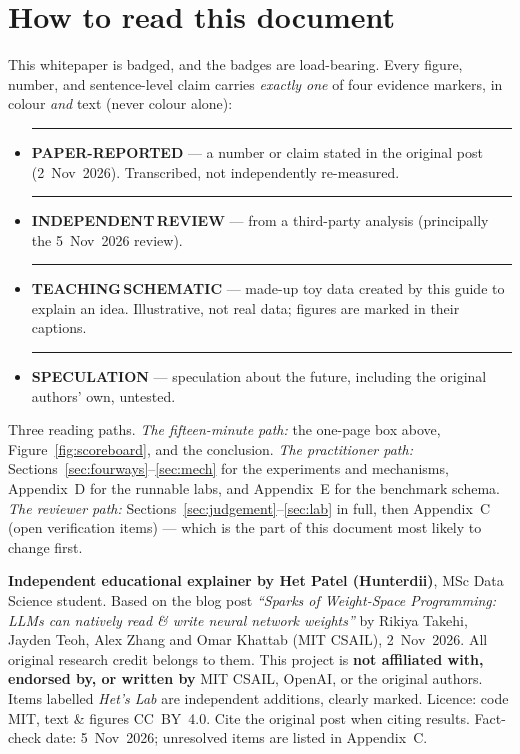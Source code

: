 \documentclass[11pt,a4paper]{article}
\newcommand{\bP}{\textcolor{wspblue}{\rule[0.12ex]{1.5mm}{1.5mm}}\;\textcolor{wspblue}{\textbf{PAPER-REPORTED}}}
\newcommand{\bR}{\textcolor{wspgreen}{\rule[0.12ex]{1.5mm}{1.5mm}}\;\textcolor{wspgreen}{\textbf{INDEPENDENT\,REVIEW}}}
\newcommand{\bS}{\textcolor{wspamber}{\rule[0.12ex]{1.5mm}{1.5mm}}\;\textcolor{wspamber}{\textbf{TEACHING\,SCHEMATIC}}}
\newcommand{\bX}{\textcolor{wspred}{\rule[0.12ex]{1.5mm}{1.5mm}}\;\textcolor{wspred}{\textbf{SPECULATION}}}
\begin{document}
\section*{How to read this document}

This whitepaper is badged, and the badges are load-bearing. Every figure, number, and sentence-level claim carries \emph{exactly one} of four evidence markers, in colour \emph{and} text (never colour alone):

\begin{itemize}[leftmargin=1.8em, itemsep=2pt]
\item \bP\; --- a number or claim stated in the original post (2~Nov~2026). Transcribed, not independently re-measured.
\item \bR\; --- from a third-party analysis (principally the 5~Nov~2026 review).
\item \bS\; --- made-up toy data created by this guide to explain an idea. Illustrative, not real data; figures are marked in their captions.
\item \bX\; --- speculation about the future, including the original authors' own, untested.
\end{itemize}

Three reading paths. \emph{The fifteen-minute path:} the one-page box above, Figure~\ref{fig:scoreboard}, and the conclusion. \emph{The practitioner path:} Sections~\ref{sec:fourways}--\ref{sec:mech} for the experiments and mechanisms, Appendix~D for the runnable labs, and Appendix~E for the benchmark schema. \emph{The reviewer path:} Sections~\ref{sec:judgement}--\ref{sec:lab} in full, then Appendix~C (open verification items) --- which is the part of this document most likely to change first.

\vspace{0.5em}
\begin{plainbox}[title={\bfseries Credits and non-affiliation}]
\small
\textbf{Independent educational explainer by Het Patel (Hunterdii)}, MSc Data Science student. Based on the blog post \emph{``Sparks of Weight-Space Programming: LLMs can natively read \& write neural network weights''} by Rikiya Takehi, Jayden Teoh, Alex Zhang and Omar Khattab (MIT CSAIL), 2~Nov~2026. All original research credit belongs to them. This project is \textbf{not affiliated with, endorsed by, or written by} MIT CSAIL, OpenAI, or the original authors. Items labelled \emph{Het's Lab} are independent additions, clearly marked. Licence: code MIT, text \& figures CC~BY~4.0. Cite the original post when citing results. Fact-check date: 5~Nov~2026; unresolved items are listed in Appendix~C.
\end{plainbox}
\end{document}
